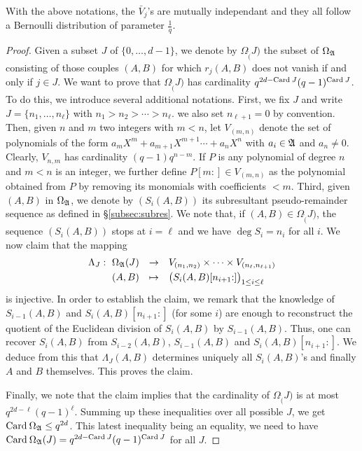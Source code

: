 \documentclass{sig-alternate}
\begin{document}
\begin{prop}
\label{prop:distribk}
With the above notations, the $\bar V_j$'s are mutually independant
and they all follow a Bernoulli distribution of parameter $\frac 1 q$.
\end{prop}

\begin{proof} 
Given a subset $J$ of $\{0, \ldots, d-1\}$, we denote by 
$\Omega_\ring(J)$ the subset of $\Omega_\mathfrak A$ consisting of those 
couples $(A,B)$ for which $r_j(A,B)$ does not vanish if and only if $j 
\in J$. We want to prove that $\Omega_\ring(J)$ has cardinality 
$q^{2d-\text{\rm Card}\: J} (q-1)^{\text{\rm Card}\: J}$. To do this, we introduce several 
additional notations. First, we fix $J$ and write $J = \{n_1, \ldots, 
n_\ell\}$ with $n_1 > n_2 > \cdots > n_\ell$. we also set $n_{\ell+1} = 
0$ by convention. Then, given $n$ and $m$ two integers with $m < n$, let 
$V_{(m,n)}$ denote the set of polynomials of the form
$a_m X^m + a_{m+1} X^{m+1} \cdots + a_n X^n$
with $a_i \in \mathfrak A$ and $a_n \neq 0$. Clearly, $V_{n,m}$ has
cardinality $(q-1) q^{n-m}$. If $P$ is any polynomial of 
degree $n$ and $m < n$ is an integer, we further define $P[m{:}] \in 
V_{(m,n)}$ as the polynomial obtained from $P$ by removing its monomials 
with coefficients $< m$. Third, given $(A,B)$ in $\Omega_\mathfrak A$, we 
denote by $(S_i(A,B))$ its subresultant pseudo-remainder sequence as 
defined in \S \ref{subsec:subres}. We note that, if $(A,B) \in 
\Omega_\ring(J)$, the sequence $(S_i(A,B))$ stops at $i = \ell$ and we 
have $\deg S_i = n_i$ for all $i$. We now claim that the mapping
$$\begin{array}{rcl} 
\Lambda_J : \,\, 
\Omega_\ring(J) & \to & 
V_{(n_1,n_2)} \times \cdots \times V_{(n_\ell,n_{\ell+1})} \smallskip \\
(A,B) & \mapsto & 
\big(S_i(A,B)[n_{i+1}{:}]\big)_{1 \leq i \leq \ell}
\end{array}$$ 
is injective. In order to establish the claim, we remark that the 
knowledge of $S_{i-1}(A,B)$ and $S_i(A,B)[n_{i+1}{:}]$ (for some $i$) 
are enough to reconstruct the quotient of the Euclidean division of 
$S_i(A,B)$ by $S_{i-1}(A,B)$. Thus, one can recover $S_i(A,B)$ from 
$S_{i-2}(A,B)$, $S_{i-1}(A,B)$ and $S_i(A,B)[n_{i+1}{:}]$. We deduce 
from this that $\Lambda_J(A,B)$ determines uniquely all $S_i(A,B)$'s 
and finally $A$ and $B$ themselves. This proves the claim.

Finally, we note that the claim implies that the cardinality of 
$\Omega_\ring(J)$ is at most $q^{2d-\ell} (q-1)^\ell$. Summing up these 
inequalities over all possible $J$, we get $\text{\rm Card}\: \Omega_\mathfrak A \leq 
q^{2d}$. This latest inequality being an equality, we need to have
$\text{\rm Card}\: \Omega_\mathfrak A(J) = q^{2d-\text{\rm Card}\: J} (q-1)^{\text{\rm Card}\: J}$ for all $J$.
\end{proof}
\end{document}
